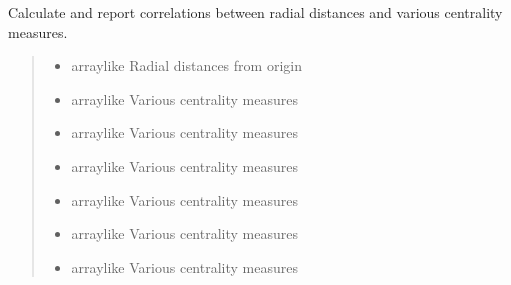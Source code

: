 \documentclass[letterpaper,10pt,english]{sphinxmanual}
\begin{document}
\begin{fulllineitems}
\label{\detokenize{api_reference:graphem.visualization.report_full_correlation_matrix}}
\pysigstartsignatures
{}
\pysigstopsignatures
\sphinxAtStartPar
Calculate and report correlations between radial distances and various centrality measures.
\begin{quote}\begin{description}
\begin{itemize}
\item {} 
\sphinxAtStartPar
{} \textendash{} array\sphinxhyphen{}like
Radial distances from origin

\item {} 
\sphinxAtStartPar
{} \textendash{} array\sphinxhyphen{}like
Various centrality measures

\item {} 
\sphinxAtStartPar
{} \textendash{} array\sphinxhyphen{}like
Various centrality measures

\item {} 
\sphinxAtStartPar
{} \textendash{} array\sphinxhyphen{}like
Various centrality measures

\item {} 
\sphinxAtStartPar
{} \textendash{} array\sphinxhyphen{}like
Various centrality measures

\item {} 
\sphinxAtStartPar
{} \textendash{} array\sphinxhyphen{}like
Various centrality measures

\item {} 
\sphinxAtStartPar
{} \textendash{} array\sphinxhyphen{}like
Various centrality measures


\end{itemize}
\end{description}
\end{quote}
\end{fulllineitems}
\end{document}
